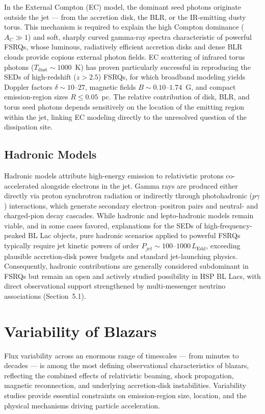 \documentclass[11pt]{article}
\begin{document}
In the External Compton (EC) model, the dominant seed photons originate outside the jet --- from the accretion disk, the BLR, or the IR-emitting dusty torus. This mechanism is required to explain the high Compton dominance ($A_C \gg 1$) and soft, sharply curved gamma-ray spectra characteristic of powerful FSRQs, whose luminous, radiatively efficient accretion disks and dense BLR clouds provide copious external photon fields. EC scattering of infrared torus photons ($T_{\text{dust}} \sim 1000$~K) has proven particularly successful in reproducing the SEDs of high-redshift ($z > 2.5$) FSRQs, for which broadband modeling yields Doppler factors $\delta \sim 10$--$27$, magnetic fields $B \sim 0.10$--$1.74$~G, and compact emission-region sizes $R \le 0.05$~pc. The relative contribution of disk, BLR, and torus seed photons depends sensitively on the location of the emitting region within the jet, linking EC modeling directly to the unresolved question of the dissipation site.

\subsection{Hadronic Models}

Hadronic models attribute high-energy emission to relativistic protons co-accelerated alongside electrons in the jet. Gamma rays are produced either directly via proton synchrotron radiation or indirectly through photohadronic ($p\gamma$) interactions, which generate secondary electron--positron pairs and neutral- and charged-pion decay cascades. While hadronic and lepto-hadronic models remain viable, and in some cases favored, explanations for the SEDs of high-frequency-peaked BL Lac objects, pure hadronic scenarios applied to powerful FSRQs typically require jet kinetic powers of order $P_{jet} \sim 100$--$1000\, L_{\text{Edd}}$, exceeding plausible accretion-disk power budgets and standard jet-launching physics. Consequently, hadronic contributions are generally considered subdominant in FSRQs but remain an open and actively studied possibility in HSP BL Lacs, with direct observational support strengthened by multi-messenger neutrino associations (Section~5.1).

\section{Variability of Blazars}

Flux variability across an enormous range of timescales --- from minutes to decades --- is among the most defining observational characteristics of blazars, reflecting the combined effects of relativistic beaming, shock propagation, magnetic reconnection, and underlying accretion-disk instabilities. Variability studies provide essential constraints on emission-region size, location, and the physical mechanisms driving particle acceleration.
\end{document}
